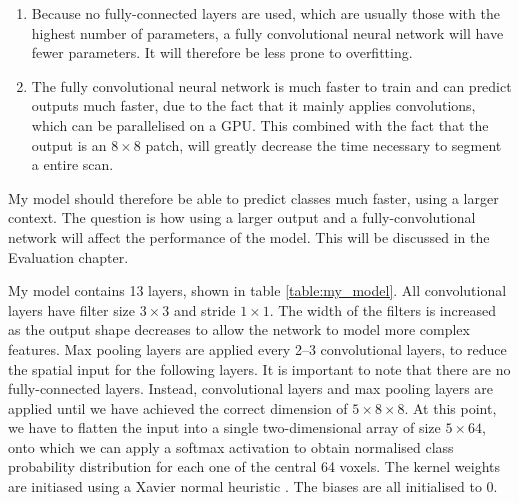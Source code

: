 \documentclass[12pt,a4paper,twoside,openright]{report}
\begin{document}
\begin{enumerate}
	\begin{enumerate}
		\item Because no fully-connected layers are used, which are usually those with the highest number of parameters, a fully convolutional neural network will have fewer parameters. It will therefore be less prone to overfitting.
		\item The fully convolutional neural network is much faster to train and can predict outputs much faster, due to the fact that it mainly applies convolutions, which can be parallelised on a GPU. This combined with the fact that the output is an $8 \times 8$ patch, will greatly decrease the time necessary to segment a entire scan.
	\end{enumerate}
\end{enumerate}

My model should therefore be able to predict classes much faster, using a larger context. The question is how using a larger output and a fully-convolutional network will affect the performance of the model. This will be discussed in the Evaluation chapter.

My model contains 13 layers, shown in table \ref{table:my_model}. All convolutional layers have filter size $3 \times 3$ and stride $1 \times 1$. The width of the filters is increased as the output shape decreases to allow the network to model more complex features. Max pooling layers are applied every 2--3 convolutional layers, to reduce the spatial input for the following layers. It is important to note that there are no fully-connected layers. Instead, convolutional layers and max pooling layers are applied until we have achieved the correct dimension of $5 \times 8 \times 8$. At this point, we have to flatten the input into a single two-dimensional array of size $5 \times 64$, onto which we can apply a softmax activation to obtain normalised class probability distribution for each one of the central 64 voxels. The kernel weights are initiased using a Xavier normal heuristic \cite{xavier_init}. The biases are all initialised to 0.
\end{document}
